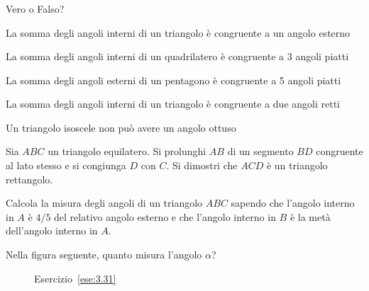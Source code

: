 \subsubsection*{}

\begin{esercizio}
\label{ese:3.47}
Vero o Falso?
\begin{enumeratea}
\item La somma degli angoli interni di un triangolo è congruente a un 
angolo esterno \hfill\boxV\quad\boxF
\item La somma degli angoli interni di un quadrilatero è congruente a 
3 angoli piatti \hfill\boxV\quad\boxF
\item La somma degli angoli esterni di un pentagono è congruente a 5 
angoli piatti\hfill\boxV\quad\boxF
\item La somma degli angoli interni di un triangolo è congruente a 
due angoli retti\hfill\boxV\quad\boxF
\item Un triangolo isoscele non può avere un angolo 
ottuso\hfill\boxV\quad\boxF
\end{enumeratea}
\end{esercizio}

\begin{esercizio}
\label{ese:3.48}
Sia $ABC$ un triangolo equilatero. Si prolunghi $AB$ di un segmento 
$BD$ congruente al lato stesso e si congiunga $D$ con $C$. Si 
dimostri che $ACD$ è un triangolo rettangolo.
\end{esercizio}

\begin{esercizio}
\label{ese:3.49}
Calcola la misura degli angoli di un triangolo $ABC$ sapendo che 
l'angolo interno in $A$ è $4/5$ del relativo angolo esterno e che 
l'angolo interno in $B$ è la metà dell'angolo interno in $A$.
\end{esercizio}

\begin{esercizio}
\label{ese:3.51}
Nella figura seguente, quanto misura l'angolo $\alpha$?  
\end{esercizio}

\begin{inaccessibleblock}
 \begin{figure}[htb]
\centering
\caption{Esercizio~\ref{ese:3.31}}\label{fig:ese3.51}
\end{figure}
\end{inaccessibleblock}

